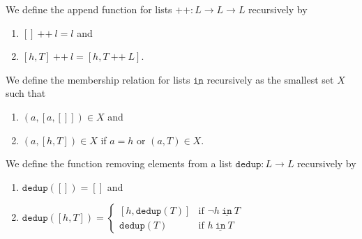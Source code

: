 \begin{definition}\label{def:List-Append}
    \leanok
    We define the append function for lists $\texttt{++}: L \to L \to L$ recursively by 
    \begin{enumerate}
    \item $[] ~\texttt{++}~ l = l$ and
    \item $[h,T] ~\texttt{++}~ l = [h,T ~\texttt{++}~ L]$.
    \end{enumerate} 
\end{definition}

\begin{definition}\label{def:List-Mem}
    \leanok
    We define the membership relation for lists $\underline{\texttt{in}}$ recursively as the smallest set $X$ such that
    \begin{enumerate}
    \item $(a,[a,[]]) \in X$ and
    \item $(a,[h,T]) \in X$ if $a = h$ or $(a,T) \in X$.
    \end{enumerate}
\end{definition}

\begin{definition}\label{def:List-Dedup}
    \leanok
    We define the function removing elements from a list $\texttt{dedup} : L \to L$ recursively by
    \begin{enumerate}
    \item $\texttt{dedup}([]) = []$ and
    \item $\texttt{dedup}([h,T]) = \begin{cases}
    [h,\texttt{dedup}(T)] & \text{if } \neg h ~\underline{\texttt{in}}~ T \\
    \texttt{dedup}(T) & \text{if } h ~\underline{\texttt{in}}~ T
    \end{cases}$
    \end{enumerate}
\end{definition}

